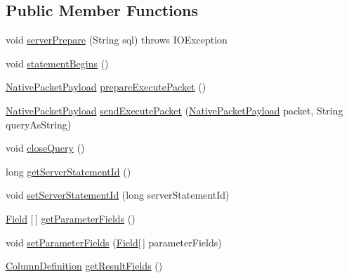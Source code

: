 \subsection*{Public Member Functions}
\begin{DoxyCompactItemize}
\item 
void \mbox{\hyperlink{classcom_1_1mysql_1_1cj_1_1_server_prepared_query_abfccd6509abf393d67f2ba609867edea}{server\+Prepare}} (String sql)  throws I\+O\+Exception 
\item 
void \mbox{\hyperlink{classcom_1_1mysql_1_1cj_1_1_server_prepared_query_a1979165e4817f532f32a5d0d8c9b1a49}{statement\+Begins}} ()
\item 
\mbox{\hyperlink{classcom_1_1mysql_1_1cj_1_1protocol_1_1a_1_1_native_packet_payload}{Native\+Packet\+Payload}} \mbox{\hyperlink{classcom_1_1mysql_1_1cj_1_1_server_prepared_query_a9e77b4c8e2491489910402fa885729fb}{prepare\+Execute\+Packet}} ()
\item 
\mbox{\hyperlink{classcom_1_1mysql_1_1cj_1_1protocol_1_1a_1_1_native_packet_payload}{Native\+Packet\+Payload}} \mbox{\hyperlink{classcom_1_1mysql_1_1cj_1_1_server_prepared_query_a8f5a41f09734ecd15eee6a12c5530716}{send\+Execute\+Packet}} (\mbox{\hyperlink{classcom_1_1mysql_1_1cj_1_1protocol_1_1a_1_1_native_packet_payload}{Native\+Packet\+Payload}} packet, String query\+As\+String)
\item 
void \mbox{\hyperlink{classcom_1_1mysql_1_1cj_1_1_server_prepared_query_a4f5928a31d2a6f738cf93f06984c22e4}{close\+Query}} ()
\item 
long \mbox{\hyperlink{classcom_1_1mysql_1_1cj_1_1_server_prepared_query_a36c52212a9bc785f9911ca76628ce0e9}{get\+Server\+Statement\+Id}} ()
\item 
void \mbox{\hyperlink{classcom_1_1mysql_1_1cj_1_1_server_prepared_query_a556ac6267fb6859db7c39af4240ba51b}{set\+Server\+Statement\+Id}} (long server\+Statement\+Id)
\item 
\mbox{\hyperlink{classcom_1_1mysql_1_1cj_1_1result_1_1_field}{Field}} \mbox{[}$\,$\mbox{]} \mbox{\hyperlink{classcom_1_1mysql_1_1cj_1_1_server_prepared_query_a611aeaa0c2fd7a8b3e49b64d4db7d2f1}{get\+Parameter\+Fields}} ()
\item 
void \mbox{\hyperlink{classcom_1_1mysql_1_1cj_1_1_server_prepared_query_ab325a0d325aef0e418802fff21f341af}{set\+Parameter\+Fields}} (\mbox{\hyperlink{classcom_1_1mysql_1_1cj_1_1result_1_1_field}{Field}}\mbox{[}$\,$\mbox{]} parameter\+Fields)
\item 
\mbox{\hyperlink{interfacecom_1_1mysql_1_1cj_1_1protocol_1_1_column_definition}{Column\+Definition}} \mbox{\hyperlink{classcom_1_1mysql_1_1cj_1_1_server_prepared_query_a969acfe777f6de6a3435912ac0c1f79b}{get\+Result\+Fields}} ()

\end{DoxyCompactItemize}
